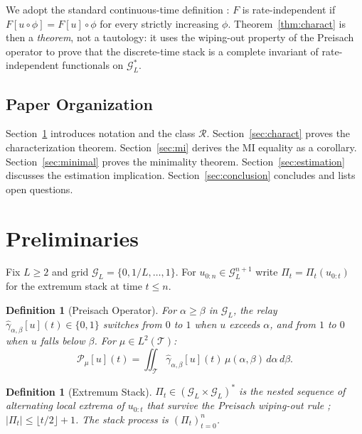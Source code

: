 \documentclass[lettersize,journal]{IEEEtran}
\newtheorem{definition}[theorem]{Definition}
\newcommand{\cR}{\mathcal{R}}
\newcommand{\stack}{\Pi}
\newcommand{\GL}{\mathcal{G}_L}
\newcommand{\cT}{\mathcal{T}}
\begin{document}
We adopt the standard continuous-time definition \cite{Brokate1996}:
$F$ is rate-independent if $F[u \circ \phi] = F[u] \circ \phi$ for
every strictly increasing $\phi$.
Theorem~\ref{thm:charact} is then a \emph{theorem}, not a tautology:
it uses the wiping-out property of the Preisach operator to prove
that the discrete-time stack is a complete invariant of
rate-independent functionals on $\GL^*$.

\subsection{Paper Organization}

Section~\ref{sec:prelim} introduces notation and the class $\cR$.
Section~\ref{sec:charact} proves the characterization theorem.
Section~\ref{sec:mi} derives the MI equality as a corollary.
Section~\ref{sec:minimal} proves the minimality theorem.
Section~\ref{sec:estimation} discusses the estimation implication.
Section~\ref{sec:conclusion} concludes and lists open questions.

\section{Preliminaries}
\label{sec:prelim}

Fix $L \geq 2$ and grid $\GL = \{0,1/L,\ldots,1\}$.
For $u_{0:n} \in \GL^{n+1}$ write
$\stack_t = \stack_t(u_{0:t})$ for the extremum stack at time
$t \leq n$.

\begin{definition}[Preisach Operator]
\label{def:preisach}
For $\alpha \geq \beta$ in $\GL$, the relay
$\hat\gamma_{\alpha,\beta}[u](t) \in \{0,1\}$ switches from $0$
to $1$ when $u$ exceeds $\alpha$, and from $1$ to $0$ when $u$
falls below $\beta$.
For $\mu \in L^2(\cT)$:
\begin{equation*}
\mathcal{P}_\mu[u](t) =
\iint_{\cT} \hat\gamma_{\alpha,\beta}[u](t)\,\mu(\alpha,\beta)
\,d\alpha\,d\beta.
\end{equation*}
\end{definition}

\begin{definition}[Extremum Stack]
\label{def:stack}
$\stack_t \in (\GL\times\GL)^*$ is the nested sequence of alternating
local extrema of $u_{0:t}$ that survive the Preisach wiping-out rule
\cite{Mayergoyz1991}; $|\stack_t| \leq \lfloor t/2\rfloor+1$.
The \emph{stack process} is $(\stack_t)_{t=0}^n$.
\end{definition}
\end{document}
